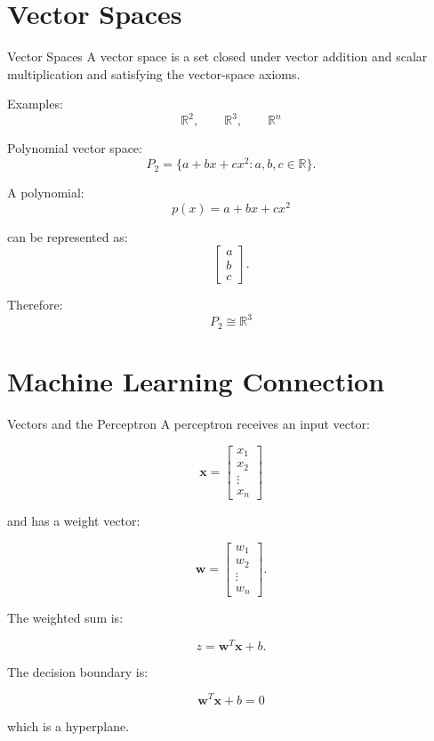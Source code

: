 \documentclass[aspectratio=169]{beamer}
\begin{document}
\section{Vector Spaces}

\begin{frame}{Vector Spaces}
A vector space is a set closed under vector addition and scalar multiplication and satisfying the vector-space axioms.

Examples:
\[
\mathbb R^2,\qquad
\mathbb R^3,\qquad
\mathbb R^n
\]

Polynomial vector space:
\[
P_2=
\{a+bx+cx^2:a,b,c\in\mathbb R\}.
\]

A polynomial:
\[
p(x)=a+bx+cx^2
\]

can be represented as:
\[
\begin{bmatrix}a\\b\\c\end{bmatrix}.
\]

Therefore:
\[
\boxed{P_2\cong\mathbb R^3}
\]
\end{frame}

\section{Machine Learning Connection}

\begin{frame}{Vectors and the Perceptron}
A perceptron receives an input vector:

\[
\mathbf x=
\begin{bmatrix}
x_1\\x_2\\\vdots\\x_n
\end{bmatrix}
\]

and has a weight vector:

\[
\mathbf w=
\begin{bmatrix}
w_1\\w_2\\\vdots\\w_n
\end{bmatrix}.
\]

The weighted sum is:

\[
z=\mathbf w^T\mathbf x+b.
\]

The decision boundary is:

\[
\boxed{
\mathbf w^T\mathbf x+b=0
}
\]

which is a hyperplane.
\end{frame}
\end{document}
